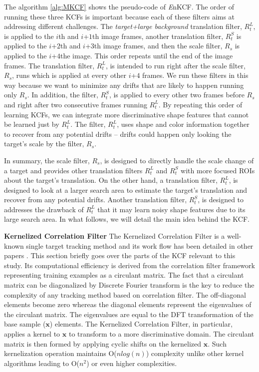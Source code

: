 \documentclass[10pt,twocolumn,letterpaper]{article}
\begin{document}
The algorithm \ref{alg:MKCF} shows the pseudo-code of {\it E}nKCF.
The order of running these three KCFs is important because each of
these filters aims at addressing different challenges. The
\textit{target+large background} translation filter, $R_{t}^{L}$, is
applied to the $i$th and $i$+$1$th image frames, another translation
filter, $R_{t}^{S}$ is applied to the $i$+$2$th and $i$+$3$th image
frames, and then the scale filter, $R_{s}$ is applied to the
$i$+$4$the image. This order repeats until the end of the image
frames. The translation filter, $R_{t}^{L}$, is intended to run right
after the scale filter, $R_s$, runs which is applied at every other
$i$+$4$ frames. We run these filters in this way because we want to
minimize any drifts that are likely to happen running only $R_{s}$. In
addition, the filter, $R_{t}^{S}$, is applied to every other two
frames before $R_{s}$ and right after two consecutive frames running
$R_{t}^{L}$. By repeating this order of learning KCFs, we can
integrate more discriminative shape features that cannot be learned
just by $R_{t}^{L}$. The filter, $R_{t}^{L}$, uses shape and color
information together to recover from any potential drifts -- drifts
could happen only looking the target's scale by the filter, $R_{s}$.

In summary, the scale filter, $R_{s}$, is designed to directly handle
the scale change of a target and provides other translation filters
$R_{t}^{L}$ and $R_{t}^{S}$ with more focused ROIs about the target's
translation. On the other hand, a translation filter, $R_{t}^{L}$, is
designed to look at a larger search area to estimate the target's
translation and recover from any potential drifts. Another translation
filter, $R_{t}^{S}$, is designed to addresses the drawback of
$R_{t}^{L}$ that it may learn noisy shape features due to its large
search area. In what follows, we will detail the main idea behind the
KCF.

\textbf{Kernelized Correlation Filter} The Kernelized Correlation
Filter is a well-known single target tracking method and its work
flow has been detailed in other papers
\cite{henriques2012exploiting,henriques2015high}. This section briefly
goes over the parts of the KCF relevant to this study. Its
computational efficiency is derived from the correlation filter
framework representing training examples as a circulant matrix. The
fact that a circulant matrix can be diagonalized by Discrete Fourier
transform is the key to reduce the complexity of any tracking method
based on correlation filter. The off-diagonal elements become zero
whereas the diagonal elements represent the eigenvalues of the
circulant matrix. The eigenvalues are equal to the DFT transformation
of the base sample ($\mathbf{x}$) elements. The Kernelized Correlation Filter,
in particular, applies a kernel to $\mathbf{x}$ to transform to a more
discriminative domain. The circulant matrix is then formed by applying
cyclic shifts on the kernelized $\mathbf{x}$. Such kernelization operation
maintains O($nlog(n)$) complexity unlike other kernel algorithms
leading to O($n^{2}$) or even higher complexities.
\end{document}
